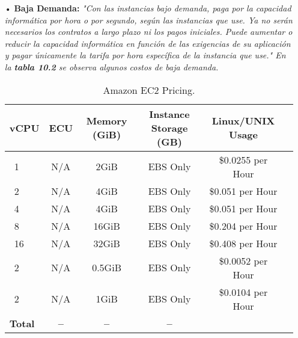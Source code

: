 \begin{itemize}
\item[•] \textbf{Baja Demanda:} \textit{"Con las instancias bajo demanda, paga por la capacidad informática por hora o por segundo, según las instancias que use. Ya no serán necesarios los contratos a largo plazo ni los pagos iniciales. Puede aumentar o reducir la capacidad informática en función de las exigencias de su aplicación y pagar únicamente la tarifa por hora específica de la instancia que use." En la \textbf{tabla 10.2} se observa algunos costos de baja demanda.}

\begin{table}[ht]
	\caption{Amazon EC2 Pricing.}
	\label{tab:hla:results}
\centering
\begin{tabular}{lccccc}
	\toprule
	\multicolumn{1}{c}{\textbf{vCPU}} 	& \textbf{ECU}	& \textbf{Memory (GiB)}	& \textbf{Instance Storage (GB)}
	& \textbf{Linux/UNIX Usage}\\
	\midrule
\cite{a1.medium}~1 		& N/A & 2GiB & EBS Only	& \$0.0255 per Hour \\
\cite{a1.large}~2 		& N/A & 4GiB & EBS Only & \$0.051 per Hour	\\
\cite{a1.xlarge}~4		& N/A & 4GiB & EBS Only & \$0.051 per Hour	\\
\cite{a1.2xlarge}~8 	& N/A & 16GiB & EBS Only & \$0.204 per Hour	\\
\cite{a1.4xlarge}~16	& N/A & 32GiB & EBS Only & \$0.408 per Hour	\\
\cite{t3.nano}~2		& N/A & 0.5GiB & EBS Only & \$0.0052 per Hour	\\
\cite{t3.micro}~2   	& N/A & 1GiB & EBS Only & \$0.0104 per Hour	\\
	\midrule
	\textbf{Total}			& \textbf{--}		& \textbf{--}		& \textbf{--} \\
	\bottomrule
\end{tabular}
\end{table}


\end{itemize}
